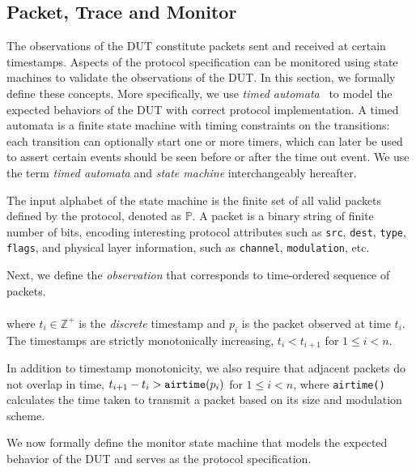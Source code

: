 \subsection{Packet, Trace and Monitor}
\label{subsec:basic}

The observations of the DUT constitute packets sent and received at certain
timestamps.
%
Aspects of the protocol specification can be monitored using state machines
to validate the observations of the DUT.
%
In this section, we formally define these concepts.
%
More specifically, we use \textit{timed automata}~\cite{alur1994theory} to model
the expected behaviors of the DUT with correct protocol implementation.
%
A timed automata is a finite state machine with timing constraints on the
transitions: each transition can optionally start one or more timers, which can
later be used to assert certain events should be seen before or after the time
out event.
%
We use the term \textit{timed automata} and \textit{state machine}
interchangeably hereafter.

The input alphabet of the state machine is the finite set of all valid packets defined
by the protocol, denoted as $\mathbb{P}$. 
%
A packet is a binary string of finite number of bits, encoding interesting
protocol attributes such as \texttt{src}, \texttt{dest}, \texttt{type},
\texttt{flags}, and physical layer information, such as \texttt{channel},
\texttt{modulation}, etc.

Next, we define the \textit{observation} that corresponds to time-ordered
sequence of packets.
\begin{definition}
  \begin{align*}
    [(t_1, p_1), (t_2, p_2),\ldots,(t_n, p_n)]
  \end{align*}%
  where $t_i \in \mathbb{Z}^+$ is the \textit{discrete} timestamp and $p_i$ is the packet
  observed at time $t_i$. The timestamps are strictly monotonically increasing,
  $t_i < t_{i+1}$ for $1 \le i < n$.
\end{definition}%

In addition to timestamp monotonicity, we also require that adjacent packets do
not overlap in time, $t_{i+1}-t_i > \text{\texttt{airtime}}(p_i)$ for $1 \le i
< n$, where \texttt{airtime()} calculates the time taken to transmit a packet
based on its size and modulation scheme.

We now formally define the monitor state machine that models the expected
behavior of the DUT and serves as the protocol specification.

